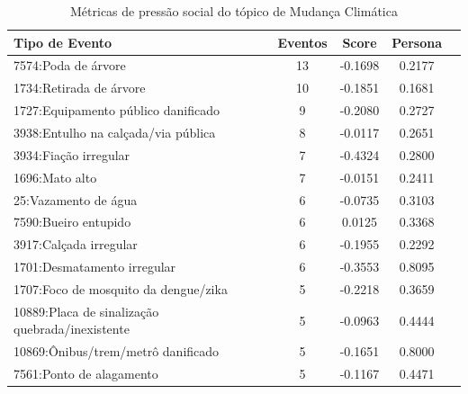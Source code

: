 \begin{table}[htbp]
	\centering
	\caption{Métricas de pressão social do tópico de Mudança Climática}
	\label{tab:eventos_populares_weather}
	\begin{tabular}{|l|c|c|c|c|}
		\hline
		\textbf{Tipo de Evento}                         & \textbf{Eventos} & \textbf{Score} & \textbf{Persona} \\
		\hline
		7574:Poda de árvore                             & 13               & -0.1698        & 0.2177           \\
		\hline
		1734:Retirada de árvore                         & 10               & -0.1851        & 0.1681           \\
		\hline
		1727:Equipamento público danificado             & 9                & -0.2080        & 0.2727           \\
		\hline
		3938:Entulho na calçada/via pública             & 8                & -0.0117        & 0.2651           \\
		\hline
		3934:Fiação irregular                           & 7                & -0.4324        & 0.2800           \\
		\hline
		1696:Mato alto                                  & 7                & -0.0151        & 0.2411           \\
		\hline
		25:Vazamento de água                            & 6                & -0.0735        & 0.3103           \\
		\hline
		7590:Bueiro entupido                            & 6                & 0.0125         & 0.3368           \\
		\hline
		3917:Calçada irregular                          & 6                & -0.1955        & 0.2292           \\
		\hline
		1701:Desmatamento irregular                     & 6                & -0.3553        & 0.8095           \\
		\hline
		1707:Foco de mosquito da dengue/zika            & 5                & -0.2218        & 0.3659           \\
		\hline
		10889:Placa de sinalização quebrada/inexistente & 5                & -0.0963        & 0.4444           \\
		\hline
		10869:Ônibus/trem/metrô danificado              & 5                & -0.1651        & 0.8000           \\
		\hline
		7561:Ponto de alagamento                        & 5                & -0.1167        & 0.4471           \\

\end{tabular}
\end{table}
